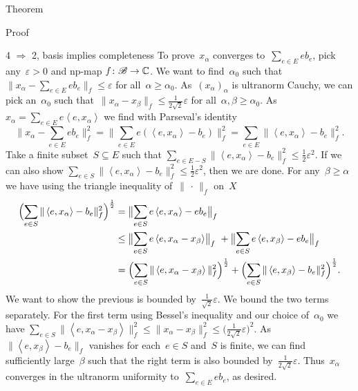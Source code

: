 \documentclass[b]{subfiles}
\begin{document}
\begin{parsec}
\begin{point}{Theorem}
\begin{point}{Proof}
\begin{point}{4 $\Rightarrow$ 2, basis implies completeness}
To prove~$x_\alpha$ converges to~$\sum_{e \in E} e b_e$,
    pick any~$\varepsilon > 0$
        and np-map $f\colon \mathscr{B} \to \mathbb{C}$.
We want to find~$\alpha_0$
    such that~$\| x_\alpha - \sum_{e \in E} e b_e\|_f \leq \varepsilon$
        for all~$\alpha \geq \alpha_0$.
As~$(x_\alpha)_\alpha$ is ultranorm Cauchy,
we can pick an~$\alpha_0$
such that~$\| x_\alpha - x_\beta \|_f \leq \frac{1}{2\sqrt{2}} \varepsilon$
for all~$\alpha,\beta \geq \alpha_0$.
As~$x_\alpha = \sum_{e \in E} e \left<e,x_\alpha\right>$
we find with Parseval's identity
\begin{equation*}
    \bigl\| x_\alpha - \sum_{e \in E} eb_e \bigr\|_f^2
    = \bigl\| \sum_{e \in E} e(\left<e, x_\alpha\right> - b_e) \bigr\|_f^2
    = \sum_{e \in E}\| \left<e, x_\alpha\right> - b_e \|_f^2.
\end{equation*}
Take a finite subset~$S \subseteq E$
such that
    $\sum_{e \in E - S}\| \left<e, x_\alpha\right> - b_e \|_f^2 \leq
        \frac{1}{2}\varepsilon^2$.
If we can also show
    $\sum_{e \in  S}\| \left<e, x_\alpha\right> - b_e \|_f^2 \leq
        \frac{1}{2}\varepsilon^2$,
        then we are done.
For any~$\beta \geq \alpha$
    we have using the triangle inequality of~$\|\,\cdot\,\|_f$
        on~$X$
\begin{align*}
    \Bigl(\sum_{e \in S}\| \left<e, x_\alpha\right>
        - b_e \|_f^2\Bigr)^{\frac{1}{2}}
        &= \bigl\|\sum_{e \in S} e\left<e, x_\alpha\right> - eb_e \bigr\|_f\\
        &\leq \bigl\|\sum_{e \in S} e\left<e, x_\alpha-x_\beta\right> \bigr\|_f\
        +\bigl\|\sum_{e \in S} e\left<e, x_\beta\right> - eb_e \bigr\|_f\\
        &= \Bigl( \sum_{e \in S}\|\left<e, x_\alpha-x_\beta\right> \|_f^2 \Bigr)^{\frac{1}{2}}
        +\Bigl(\sum_{e \in S}\| \left<e, x_\beta\right> - b_e \|_f^2
        \Bigr)^{\frac{1}{2}}.
\end{align*}
We want to show the previous is bounded by~$\frac{1}{\sqrt{2}}\varepsilon$.
We bound the two terms separately.
For the first term using Bessel's
inequality and our choice of~$\alpha_0$
we have
$\sum_{e \in S}\|\left<e, x_\alpha-x_\beta\right> \|_f^2 
\leq \|x_\alpha - x_\beta\|^2_f \leq \bigl(\frac{1}{2\sqrt{2}}\varepsilon\bigr)^2.$
As~$\|\left<e,x_\beta\right> - b_e\|_f$
vanishes for each~$e \in S$ and~$S$ is finite,
we can find sufficiently large~$\beta$
such that the right term is also bounded by~$\frac{1}{2\sqrt{2}}\varepsilon$.
Thus~$x_\alpha$ converges in the ultranorm uniformity
to~$\sum_{e \in E} e b_e$, as desired.
\end{point}

\end{point}
\end{point}
\end{parsec}
\end{document}

